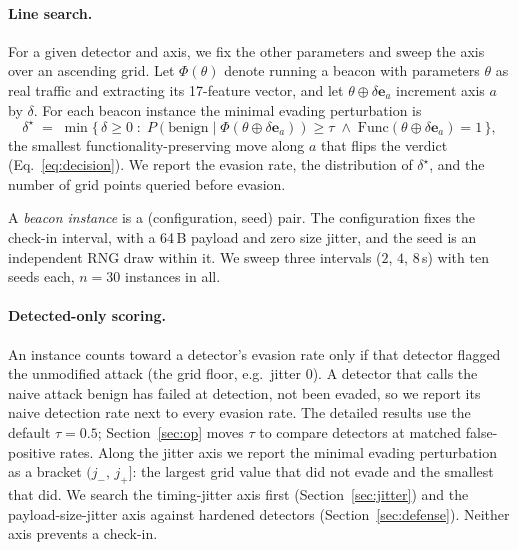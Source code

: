 \documentclass[preprint,12pt]{elsarticle}
\begin{document}
\paragraph{Line search.} For a given detector and axis, we fix the other parameters and sweep the axis
over an ascending grid. Let $\Phi(\theta)$ denote running a beacon with parameters $\theta$ as real
traffic and extracting its 17-feature vector, and let $\theta\oplus\delta\mathbf{e}_a$ increment axis
$a$ by $\delta$. For each beacon instance the minimal evading perturbation is
\begin{equation}
\delta^{\star} \;=\; \min\big\{\,\delta\ge 0 \;:\;
P(\text{benign}\mid\Phi(\theta\oplus\delta\mathbf{e}_a)) \ge \tau \;\wedge\; \mathrm{Func}(\theta\oplus\delta\mathbf{e}_a)=1\,\big\},
\label{eq:evasion}
\end{equation}
the smallest functionality-preserving move along $a$ that flips the verdict (Eq.~\ref{eq:decision}). We
report the evasion rate, the distribution of $\delta^{\star}$, and the number of grid points queried
before evasion.

A \emph{beacon instance} is a (configuration, seed) pair. The configuration fixes the check-in
interval, with a 64\,B payload and zero size jitter, and the seed is an independent RNG draw within it.
We sweep three intervals ($2$, $4$, $8$\,s) with ten seeds each, $n=30$ instances in all.

\paragraph{Detected-only scoring.} An instance counts toward a detector's evasion rate only if that
detector flagged the unmodified attack (the grid floor, e.g.\ jitter $0$). A detector that calls the
naive attack benign has failed at detection, not been evaded, so we report its naive detection rate
next to every evasion rate. The detailed results use the default $\tau=0.5$;
Section~\ref{sec:op} moves $\tau$ to compare detectors at matched false-positive rates. Along the
jitter axis we report the minimal evading perturbation as a bracket $(j_{-},\,j_{+}]$: the largest grid
value that did not evade and the smallest that did. We search the timing-jitter axis first
(Section~\ref{sec:jitter}) and the payload-size-jitter axis against hardened detectors
(Section~\ref{sec:defense}). Neither axis prevents a check-in.
\end{document}
